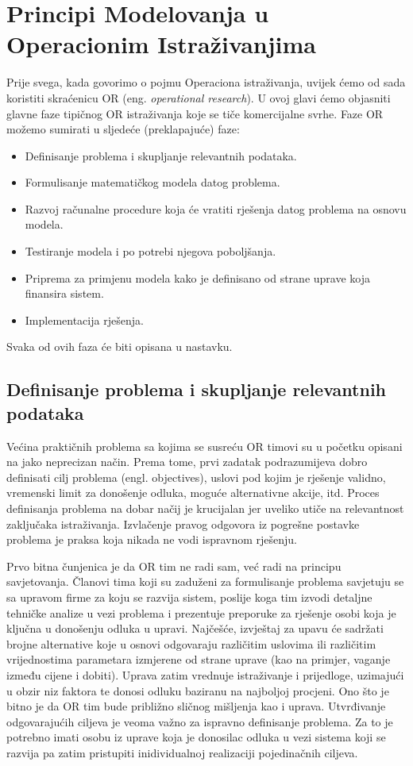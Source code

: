 \documentclass[a4paper, utf8, 11pt, colorlinks]{article}
\begin{document}
 
\section{Principi Modelovanja u Operacionim Istraživanjima}
Prije svega, kada govorimo o pojmu Operaciona istraživanja, uvijek ćemo od sada koristiti skraćenicu OR (eng. \emph{operational research}). 
U ovoj glavi ćemo objasniti   glavne faze tipičnog OR istraživanja koje se tiče komercijalne svrhe. Faze OR možemo sumirati u sljedeće (preklapajuće) faze: 
\begin{itemize}
    \item Definisanje problema i skupljanje relevantnih podataka.
    \item Formulisanje matematičkog modela datog problema.
    \item Razvoj računalne procedure koja će vratiti rješenja datog problema na osnovu modela.
    \item Testiranje modela i po potrebi njegova poboljšanja.
    \item Priprema za primjenu modela kako je definisano od strane uprave koja finansira sistem.
    \item Implementacija rješenja.
\end{itemize}
 Svaka od ovih faza će biti opisana u nastavku.
 
 \subsection{Definisanje problema i skupljanje relevantnih podataka}
 
Većina praktičnih problema sa kojima se susreću OR timovi su u početku opisani na jako neprecizan način. Prema tome, prvi zadatak podrazumijeva dobro definisati  cilj problema (engl. objectives), uslovi pod kojim je rješenje validno,  vremenski limit za donošenje odluka, moguće alternativne akcije, itd. Proces definisanja problema na dobar načij je krucijalan jer uveliko utiče na relevantnost zaključaka istraživanja. Izvlačenje pravog odgovora iz pogrešne postavke problema je praksa koja nikada ne vodi ispravnom rješenju.  

Prvo bitna čunjenica je da OR tim ne radi sam, već radi na principu savjetovanja. Članovi tima koji su zaduženi za formulisanje problema savjetuju se sa upravom firme za koju se razvija sistem, poslije koga tim izvodi detaljne tehničke analize u vezi problema i prezentuje preporuke za rješenje  osobi koja je ključna u donošenju odluka u upravi.  
Najčešće, izvještaj za upavu će sadržati brojne alternative koje u osnovi odgovaraju različitim uslovima ili različitim  vrijednostima parametara izmjerene od strane uprave (kao na primjer, vaganje između cijene i dobiti). Uprava zatim vrednuje istraživanje i prijedloge, uzimajući u obzir  niz faktora te donosi odluku baziranu na najboljoj procjeni. Ono što je bitno je da OR tim bude približno sličnog mišljenja kao i uprava. Utvrđivanje odgovarajućih ciljeva je veoma važno za ispravno definisanje problema.  Za to je potrebno imati osobu iz uprave koja je donosilac odluka u vezi sistema koji se razvija pa zatim pristupiti inidividualnoj realizaciji pojedinačnih ciljeva.
\end{document}
